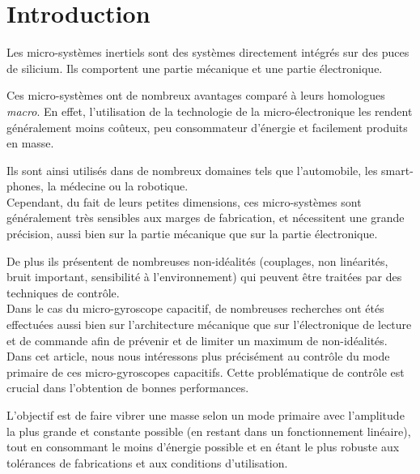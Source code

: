 \chapter*{Introduction}%
\label{sec:introduction}

Les micro-systèmes inertiels sont des systèmes directement intégrés sur des puces de silicium. Ils comportent une partie mécanique et une partie électronique.

Ces micro-systèmes ont de nombreux avantages comparé à leurs homologues \textit{macro}. En effet, l'utilisation de la technologie de la micro-électronique les rendent généralement moins coûteux, peu consommateur d'énergie et facilement produits en masse.

Ils sont ainsi utilisés dans de nombreux domaines tels que l'automobile, les smart-phones, la médecine ou la robotique.\\

Cependant, du fait de leurs petites dimensions, ces micro-systèmes sont généralement très sensibles aux marges de fabrication, et nécessitent une grande précision, aussi bien sur la partie mécanique que sur la partie électronique.

De plus ils présentent de nombreuses non-idéalités (couplages, non linéarités, bruit important, sensibilité à l'environnement) qui peuvent être traitées par des techniques de contrôle.\\

Dans le cas du micro-gyroscope capacitif, de nombreuses recherches ont étés effectuées aussi bien sur l'architecture mécanique que sur l'électronique de lecture et de commande afin de prévenir et de limiter un maximum de non-idéalités.\\

Dans cet article, nous nous intéressons plus précisément au contrôle du mode primaire de ces micro-gyroscopes capacitifs. Cette problématique de contrôle est crucial dans l'obtention de bonnes performances.

L'objectif est de faire vibrer une masse selon un mode primaire avec l'amplitude la plus grande et constante possible (en restant dans un fonctionnement linéaire), tout en consommant le moins d'énergie possible et en étant le plus robuste aux tolérances de fabrications et aux conditions d'utilisation.\\

